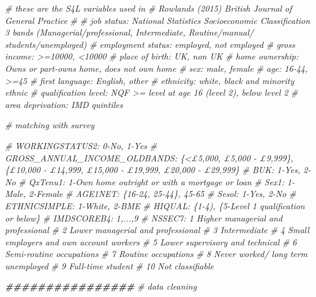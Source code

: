 \documentclass[
]{article}
\newenvironment{Shaded}{\begin{snugshade}}{\end{snugshade}}
\newcommand{\CommentTok}[1]{\textcolor[rgb]{0.56,0.35,0.01}{\textit{#1}}}
\newcommand{\DocumentationTok}[1]{\textcolor[rgb]{0.56,0.35,0.01}{\textbf{\textit{#1}}}}
\begin{document}
\begin{Shaded}
\begin{Highlighting}[]
\CommentTok{\# these are the S4L variables used in}
\CommentTok{\# Rowlands (2015) British Journal of General Practice}
\CommentTok{\#}
\CommentTok{\# job status: National Statistics Socioeconomic Classification 3 bands (Managerial/professional, Intermediate, Routine/manual/ students/unemployed)}
\CommentTok{\# employment status: employed, not employed}
\CommentTok{\# gross income: \textgreater{}=10000, \textless{}10000}
\CommentTok{\# place of birth: UK, non UK}
\CommentTok{\# home ownership: Owns or part{-}owns home, does not own home}
\CommentTok{\# sex: male, female}
\CommentTok{\# age: 16{-}44, \textgreater{}=45}
\CommentTok{\# first language: English, other}
\CommentTok{\# ethnicity: white, black and minority ethnic}
\CommentTok{\# qualification level: NQF \textgreater{}= level at age 16 (level 2), below level 2}
\CommentTok{\# area deprivation: IMD quintiles}

\CommentTok{\# matching with survey}

\CommentTok{\# WORKINGSTATUS2: 0{-}No, 1{-}Yes}
\CommentTok{\# GROSS\_ANNUAL\_INCOME\_OLDBANDS: \{\textless{}£5,000, £5,000 {-} £9,999\}, \{£10,000 {-} £14,999, £15,000 {-} £19,999, £20,000 {-} £29,999\}}
\CommentTok{\# BUK: 1{-}Yes, 2{-}No}
\CommentTok{\# QxTenu1: 1{-}Own home outright or with a mortgage or loan}
\CommentTok{\# Sex1: 1{-}Male, 2{-}Female}
\CommentTok{\# AGE1NET: \{16{-}24, 25{-}44\}, 45{-}65}
\CommentTok{\# Sesol: 1{-}Yes, 2{-}No}
\CommentTok{\# ETHNICSIMPLE: 1{-}White, 2{-}BME}
\CommentTok{\# HIQUAL: \{1{-}4), \{5{-}Level 1 qualification or below\}}
\CommentTok{\# IMDSCOREB4: 1,...,9}
\CommentTok{\# NSSEC7: 1 Higher managerial and professional}
\CommentTok{\# 2 Lower managerial and professional}
\CommentTok{\# 3 Intermediate}
\CommentTok{\# 4 Small employers and own account workers}
\CommentTok{\# 5 Lower supervisory and technical}
\CommentTok{\# 6 Semi{-}routine occupations}
\CommentTok{\# 7 Routine occupations}
\CommentTok{\# 8 Never worked/ long term unemployed}
\CommentTok{\# 9 Full{-}time student}
\CommentTok{\# 10    Not classifiable}

\DocumentationTok{\#\#\#\#\#\#\#\#\#\#\#\#\#\#\#\#}
\CommentTok{\# data cleaning}


\end{Highlighting}
\end{Shaded}
\end{document}
